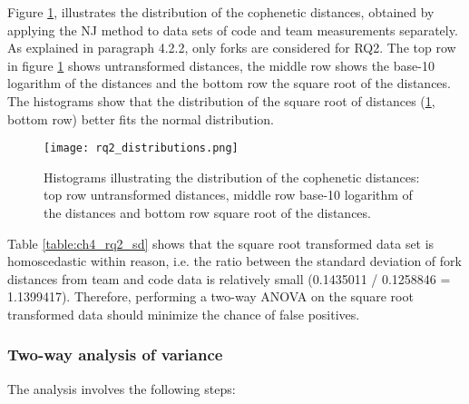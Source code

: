 Figure \ref{fig:rq2_distributions}, illustrates the distribution of the cophenetic distances, obtained by applying the NJ method to data sets of code and team measurements separately. As explained in paragraph 4.2.2, only forks are considered for RQ2. The top row in figure \ref{fig:rq2_distributions} shows untransformed distances, the middle row shows the base-10 logarithm of the distances and the bottom row the square root of the distances. The histograms show that the distribution of the square root of distances (\ref{fig:rq2_distributions}, bottom row) better fits the normal distribution.

\begin{figure}[H]
  \centering
  \texttt{[image: rq2\_distributions.png]}
  \caption{Histograms illustrating the distribution of the cophenetic distances: top row untransformed distances, middle row base-10 logarithm of the distances and bottom row square root of the distances.}
  \label{fig:rq2_distributions}
\end{figure}


\noindent
Table \ref{table:ch4_rq2_sd} shows that the square root transformed data set is homoscedastic within reason, i.e. the ratio between the standard deviation of fork distances from team and code data is relatively small (0.1435011 / 0.1258846 = 1.1399417). Therefore, performing a two-way ANOVA on the square root transformed data should minimize the chance of false positives.



\subsubsection{Two-way analysis of variance}
The analysis involves the following steps:

